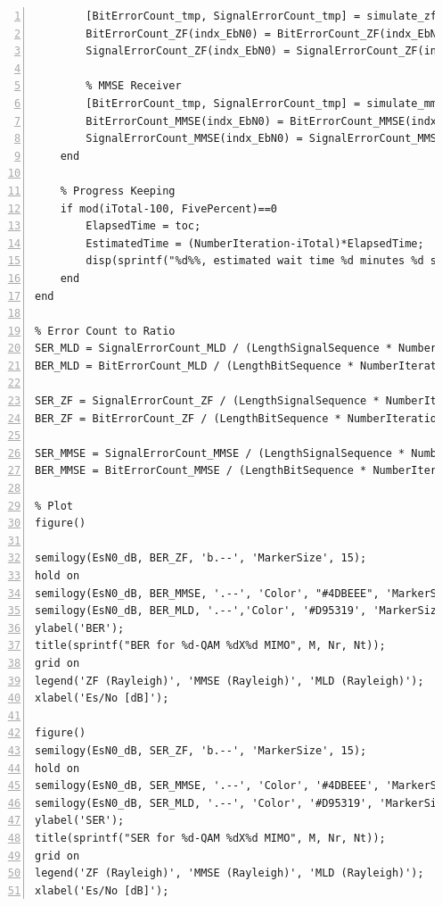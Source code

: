 \documentclass{article}
\begin{document}
\begin{lstlisting}[style=Matlab-editor, frame=single, numbers=left,]
        % ZF Receiver
        [BitErrorCount_tmp, SignalErrorCount_tmp] = simulate_zf(ReceivedSymbolSequence, SignalSequence, SignalBinary, M, H, EsN0(indx_EbN0));
        BitErrorCount_ZF(indx_EbN0) = BitErrorCount_ZF(indx_EbN0) + BitErrorCount_tmp;
        SignalErrorCount_ZF(indx_EbN0) = SignalErrorCount_ZF(indx_EbN0) + SignalErrorCount_tmp;
        
        % MMSE Receiver
        [BitErrorCount_tmp, SignalErrorCount_tmp] = simulate_mmse(ReceivedSymbolSequence, SignalSequence, SignalBinary, M, H, EsN0(indx_EbN0));
        BitErrorCount_MMSE(indx_EbN0) = BitErrorCount_MMSE(indx_EbN0) + BitErrorCount_tmp;
        SignalErrorCount_MMSE(indx_EbN0) = SignalErrorCount_MMSE(indx_EbN0) + SignalErrorCount_tmp;
    end

    % Progress Keeping
    if mod(iTotal-100, FivePercent)==0
        ElapsedTime = toc;
        EstimatedTime = (NumberIteration-iTotal)*ElapsedTime;
        disp(sprintf("%d%%, estimated wait time %d minutes %d seconds", round(iTotal/NumberIteration*100), floor(EstimatedTime/60), floor(mod(EstimatedTime, 60))))
    end
end

% Error Count to Ratio
SER_MLD = SignalErrorCount_MLD / (LengthSignalSequence * NumberIteration);
BER_MLD = BitErrorCount_MLD / (LengthBitSequence * NumberIteration);

SER_ZF = SignalErrorCount_ZF / (LengthSignalSequence * NumberIteration);
BER_ZF = BitErrorCount_ZF / (LengthBitSequence * NumberIteration);

SER_MMSE = SignalErrorCount_MMSE / (LengthSignalSequence * NumberIteration);
BER_MMSE = BitErrorCount_MMSE / (LengthBitSequence * NumberIteration);

% Plot
figure()

semilogy(EsN0_dB, BER_ZF, 'b.--', 'MarkerSize', 15);
hold on
semilogy(EsN0_dB, BER_MMSE, '.--', 'Color', "#4DBEEE", 'MarkerSize', 15);
semilogy(EsN0_dB, BER_MLD, '.--','Color', '#D95319', 'MarkerSize', 15);
ylabel('BER');
title(sprintf("BER for %d-QAM %dX%d MIMO", M, Nr, Nt));
grid on
legend('ZF (Rayleigh)', 'MMSE (Rayleigh)', 'MLD (Rayleigh)');
xlabel('Es/No [dB]');

figure()
semilogy(EsN0_dB, SER_ZF, 'b.--', 'MarkerSize', 15);
hold on
semilogy(EsN0_dB, SER_MMSE, '.--', 'Color', '#4DBEEE', 'MarkerSize', 15); 
semilogy(EsN0_dB, SER_MLD, '.--', 'Color', '#D95319', 'MarkerSize', 15);
ylabel('SER');
title(sprintf("SER for %d-QAM %dX%d MIMO", M, Nr, Nt));
grid on
legend('ZF (Rayleigh)', 'MMSE (Rayleigh)', 'MLD (Rayleigh)');
xlabel('Es/No [dB]');
\end{lstlisting}
\end{document}
